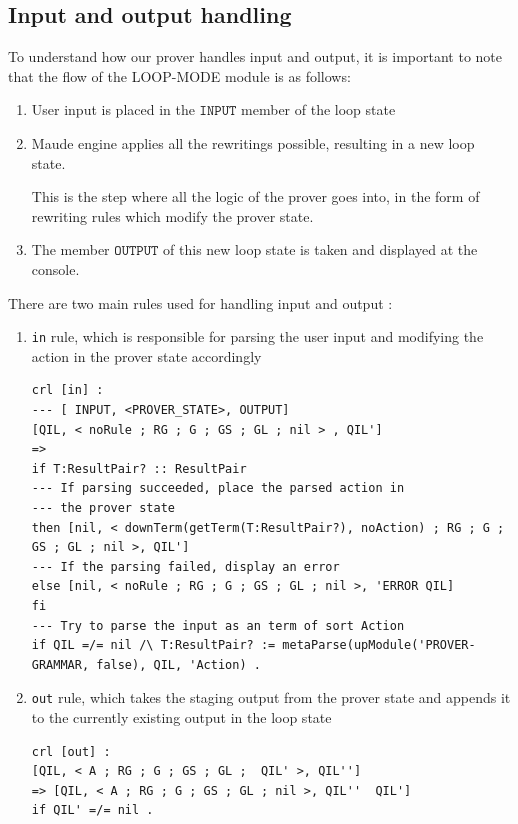 \documentclass[12pt,a4paper]{article}
\begin{document}
{\subsection{Input and output handling}
To understand how our prover handles input and output, it is important to note that the flow of the LOOP-MODE module is as follows: 
\begin{enumerate}
	\item User input is placed in the \(\mathtt{INPUT}\) member of the loop state
	\item Maude engine applies all the rewritings possible, resulting in a new loop state. 
	
	This is the step where all the logic of the prover goes into, in the form of rewriting rules which modify the prover state.
	\item The member \(\mathtt{OUTPUT}\) of this new loop state is taken and displayed at the console.
\end{enumerate}
There are two main rules used for handling input and output : 
\begin{enumerate}
	\item{\texttt{in} rule, which is responsible for parsing the user input and modifying the action in the prover state accordingly}
	\begin{lstlisting}[caption=in rule]
crl [in] : 
--- [ INPUT, <PROVER_STATE>, OUTPUT]
[QIL, < noRule ; RG ; G ; GS ; GL ; nil > , QIL']
=> 
if T:ResultPair? :: ResultPair  
--- If parsing succeeded, place the parsed action in
--- the prover state
then [nil, < downTerm(getTerm(T:ResultPair?), noAction) ; RG ; G ; GS ; GL ; nil >, QIL']  
--- If the parsing failed, display an error
else [nil, < noRule ; RG ; G ; GS ; GL ; nil >, 'ERROR QIL]  
fi  
--- Try to parse the input as an term of sort Action
if QIL =/= nil /\ T:ResultPair? := metaParse(upModule('PROVER-GRAMMAR, false), QIL, 'Action) .
\end{lstlisting}
	\item{\texttt{out} rule, which takes the staging output from the prover state and appends it to the currently existing output in the loop state}
	\begin{lstlisting}[caption=out rule]
crl [out] :
[QIL, < A ; RG ; G ; GS ; GL ;  QIL' >, QIL'']
=> [QIL, < A ; RG ; G ; GS ; GL ; nil >, QIL''  QIL']
if QIL' =/= nil .
\end{lstlisting}
\end{enumerate}

}
\end{document}
